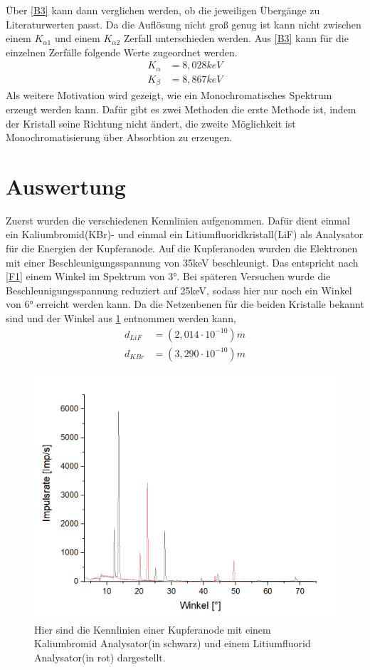 \documentclass[
	a4paper,
	12pt,
	pagesize,
	ngerman
]{scrartcl}
\begin{document}
Über \cref{B3} kann dann verglichen werden, ob die jeweiligen Übergänge zu Literaturwerten passt. Da die Auflösung nicht groß genug ist kann nicht zwischen einem $K_{\alpha1}$ und einem $K_{\alpha2}$ Zerfall unterschieden werden. Aus \cref{B3} kann für die einzelnen Zerfälle folgende Werte zugeordnet werden.
\begin{align*}
    K_{\alpha} &= 8,028 keV \\
    K_{\beta} &= 8,867 keV
\end{align*}
Als weitere Motivation wird gezeigt, wie ein Monochromatisches Spektrum erzeugt werden kann. Dafür gibt es zwei Methoden die erste Methode ist, indem der Kristall seine Richtung nicht ändert, die zweite Möglichkeit ist Monochromatisierung über Absorbtion zu erzeugen.

\section{Auswertung}
Zuerst wurden die verschiedenen Kennlinien aufgenommen. Dafür dient einmal ein Kaliumbromid(KBr)- und einmal ein Litiumfluoridkristall(LiF) als Analysator für die Energien der Kupferanode. Auf die Kupferanoden wurden die Elektronen mit einer Beschleunigungsspannung von 35keV beschleunigt. Das entspricht nach \cref{F1} einem Winkel im Spektrum von 3°. Bei späteren Versuchen wurde die Beschleunigungsspannung reduziert auf 25keV, sodass hier nur noch ein Winkel von 6° erreicht werden kann. Da die Netzenbenen für die beiden Kristalle bekannt sind und der Winkel aus \cref{A1} entnommen werden kann,
\begin{align*}
    d_{LiF} &= (2,014 \cdot 10^{-10})m \\
    d_{KBr} &= (3,290 \cdot 10^{-10})m  
\end{align*}
\begin{figure}[h!]
    \centering
    \includegraphics[scale = 0.6]{lif-kbr.png}
    \caption{Hier sind die Kennlinien einer Kupferanode mit einem Kaliumbromid Analysator(in schwarz) und einem Litiumfluorid Analysator(in rot) dargestellt.}
    \label{A1}
\end{figure}
\end{document}
